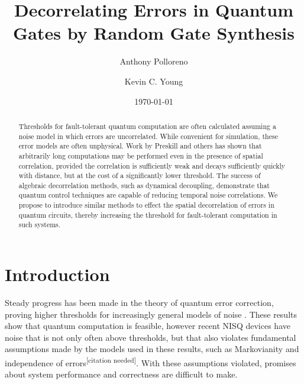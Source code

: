 \documentclass[aps,nofootinbib,pra,notitlepage,twocolumn]{revtex4-1}
\newcommand{\needcite}{{\color{blue}\textsuperscript{[citation needed]}}}
\begin{document}
\tableofcontents
\title{Decorrelating Errors in Quantum Gates by Random Gate Synthesis}

\author{Anthony Polloreno}

\author{Kevin C. Young}

\date{\today}

\begin{abstract}
Thresholds for fault-tolerant quantum computation are often calculated assuming a noise model in which errors are uncorrelated. While convenient for simulation, these error models are often unphysical. Work by Preskill and others has shown that arbitrarily long computations may be performed even in the presence of spatial correlation, provided the correlation is sufficiently weak and decays sufficiently quickly with distance, but at the cost of a significantly lower threshold. The success of algebraic decorrelation methods, such as dynamical decoupling, demonstrate that quantum control techniques are capable of reducing temporal noise correlations. We propose to introduce similar methods to effect the spatial decorrelation of errors in quantum circuits, thereby increasing the threshold for fault-tolerant computation in such systems.
\end{abstract}

\pacs{}

\maketitle

\section{Introduction}

Steady progress has been made in the theory of quantum error correction, proving higher thresholds for increasingly general models of noise \cite{Aharonov2006}. These results show that quantum computation is feasible, however recent NISQ \cite{Preskill2018} devices have noise that is not only often above thresholds, but that also violates fundamental assumptions made by the models used in these results, such as Markovianity \cite{Kitaev1997} and independence of errors\needcite. With these assumptions violated, promises about system performance and correctness are difficult to make.
\end{document}
